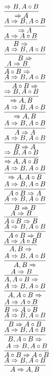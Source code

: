 \documentclass[11pt]{article}
\begin{document}
\begin{center}

$\infer{\Rightarrow A}{\Rightarrow B, A\circ B}$
\bigskip
\\$\infer{\Rightarrow A}{A\Rightarrow B, A\circ B}$
\bigskip
\\$\infer{B\Rightarrow }{A\Rightarrow A\circ B}$
\bigskip
\\$\infer{B\Rightarrow }{A\Rightarrow B, A\circ B}$
\bigskip
\\$\infer{A\circ B\Rightarrow }{A\Rightarrow B}$
\bigskip
\\$\infer{A\circ B\Rightarrow }{A\Rightarrow B, A\circ B}$
\bigskip
\\$\infer{\Rightarrow A, B}{\Rightarrow B, A\circ B}$
\bigskip
\\$\infer{\Rightarrow A, B}{A\Rightarrow B, A\circ B}$
\bigskip
\\$\infer{A\Rightarrow A}{A\Rightarrow B, A\circ B}$
\bigskip
\\$\infer{B\Rightarrow A}{A\Rightarrow B, A\circ B}$
\bigskip
\\$\infer{\Rightarrow A, A\circ B}{\Rightarrow B, A\circ B}$
\bigskip
\\$\infer{\Rightarrow A, A\circ B}{A\Rightarrow B, A\circ B}$
\bigskip
\\$\infer{A\circ B\Rightarrow A}{A\Rightarrow B, A\circ B}$
\bigskip
\\$\infer{B\Rightarrow B}{A\Rightarrow B, A\circ B}$
\bigskip
\\$\infer{A\circ B\Rightarrow B}{A\Rightarrow B}$
\bigskip
\\$\infer{A\circ B\Rightarrow B}{A\Rightarrow B, A\circ B}$
\bigskip
\\$\infer{A, B\Rightarrow }{A\Rightarrow A\circ B}$
\bigskip
\\$\infer{A, B\Rightarrow }{A\Rightarrow B, A\circ B}$
\bigskip
\\$\infer{A, A\circ B\Rightarrow }{A\Rightarrow B}$
\bigskip
\\$\infer{A, A\circ B\Rightarrow }{A\Rightarrow B, A\circ B}$
\bigskip
\\$\infer{B\Rightarrow A\circ B}{A\Rightarrow A\circ B}$
\bigskip
\\$\infer{B\Rightarrow A\circ B}{A\Rightarrow B, A\circ B}$
\bigskip
\\$\infer{B, A\circ B\Rightarrow }{A\Rightarrow B, A\circ B}$
\bigskip
\\$\infer{A\circ B\Rightarrow A\circ B}{A\Rightarrow B, A\circ B}$
\bigskip
\\$\infer{A\Rightarrow A, B}{A\Rightarrow B, A\circ B}$

\end{center}
\end{document}
